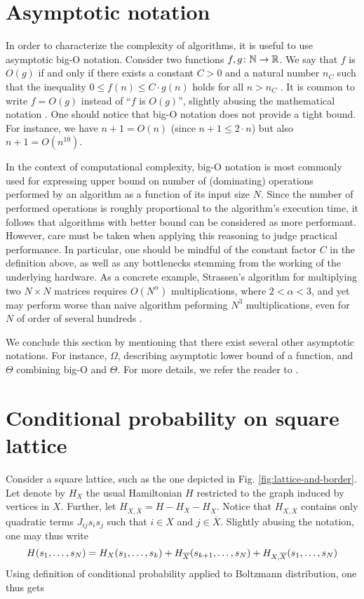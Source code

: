 \chapter{Asymptotic notation}

In order to characterize the complexity of algorithms, it is useful to use
asymptotic big-O notation. Consider two functions $f, g \colon \mathbb{N} \to \mathbb{R}$. We
say that $f$ is $O(g)$ if and only if there exists a constant $C > 0$ and a
natural number $n_{C}$ such that the inequality $0 \le f(n) \le C\cdot g(n)$
    holds for all $n > n_{C}$ \cite{clrs}. It is common to write $f=O(g)$ instead
of ``$f$ is $O(g)$'', slightly abusing the mathematical notation \cite{clrs}.
One should notice that big-O notation does not provide a tight bound. For
instance, we have $n + 1 = O(n)$ (since $n + 1 \le 2 \cdot n$) but also $n+1 =
  O(n^{10})$.

    In the context of computational complexity, big-O notation is most commonly
    used for expressing upper bound on number of (dominating) operations performed
    by an algorithm as a function of its input size $N$. Since the number of
    performed operations is roughly proportional to the algorithm's execution time,
    it follows that algorithms with better bound can be considered as more
    performant. However, care must be taken when applying this reasoning to judge
    practical performance. In particular, one should be mindful of the constant
    factor $C$ in the definition above, as well as any bottlenecks stemming from
    the working of the underlying hardware. As a concrete example, Strassen's
    algorithm for multiplying two $N \times N$ matrices requires $O(N^{\alpha})$
    multiplications, where $2 < \alpha < 3$, and yet may perform worse than naive
    algorithm peforming $N^{3}$ multiplications, even for $N$ of order of several
hundreds \cite{dalberto}.

We conclude this section by mentioning that there exist several other
asymptotic notations. For instance, $\Omega$, describing asymptotic lower bound
of a function, and $\Theta$ combining big-O and $\Theta$. For more details, we
refer the reader to \cite{clrs}.

\chapter{Conditional probability on square lattice}
\label{sec:probability}
Consider a square lattice, such as the one depicted in Fig. \ref{fig:lattice-and-border}.
Let denote by $H_X$ the usual Hamiltonian $H$ restricted to the graph
induced by vertices in $X$. Further, let $H_{X, \overline{X}} = H - H_X -
  H_{\overline{X}}$. Notice that $H_{X, \overline{X}}$ contains only quadratic
    terms $J_{ij} s_i s_j$ such that $i \in X$ and $j \in \overline{X}$. Slightly
    abusing the notation, one may thus write
    \begin{equation}
      \small
      H(s_1, \ldots, s_N) = H_X(s_1, \ldots, s_k) + H_{\overline{X}}(s_{k+1}, \ldots, s_N) + H_{X, \overline{X}}(s_1, \ldots, s_N)
    \end{equation}
    Using definition of conditional probability applied to Boltzmann distribution,
    one thus gets

